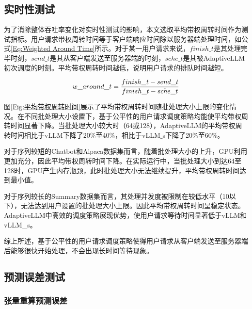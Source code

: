 \subsection{实时性测试}

为了消除整体吞吐率变化对实时性测试的影响，本文选取平均带权周转时间作为测试指标。用户请求带权周转时间等于客户端响应时间除以服务器端处理时间，如公式\ref{Eq:Weighted Around Time}所示。对于某一用户请求来说，$finish\_t$是其处理完毕时刻，$send\_t$是其从客户端发送至服务器端的时刻，$sche\_t$是其被AdaptiveLLM初次调度的时刻。平均带权周转时间越低，说明用户请求的排队时间越短。 

\begin{equation}
  \begin{aligned}
    w\_around\_t = \frac{finish\_t - send\_t}{finish\_t - sche\_t}
  \end{aligned}
  \label{Eq:Weighted Around Time}
  \setlength{\abovedisplayskip}{0ex}
  \setlength{\belowdisplayskip}{2ex}
\end{equation}


图\ref{Fig:平均带权周转时间}展示了平均带权周转时间随批处理大小上限的变化情况。在不同批处理大小设置下，基于公平性的用户请求调度策略均能使平均带权周转时间显著下降。当批处理大小较大时（64或128），AdaptiveLLM的平均带权周转时间相比于vLLM下降了20\%至40\%，相比于vLLM$\_$s下降了20\%至60\%。

对于序列较短的Chatbot和Alpaca数据集而言，随着批处理大小的上升，GPU利用更加充分，因此平均带权周转时间下降。在实际运行中，当批处理大小到达64至128时，GPU产生内存瓶颈，此时批处理大小无法继续提升，平均带权周转时间达到最小值。

对于序列较长的Summary数据集而言，其处理并发度被限制在较低水平（10以下），无法达到用户设置的批处理大小上限。因此平均带权周转时间呈稳定状态。AdaptiveLLM中高效的调度策略展现优势，使用户请求等待时间显著低于vLLM和vLLM\_s。

综上所述，基于公平性的用户请求调度策略使得用户请求从客户端发送至服务器端后能够很快开始处理，不会出现长时间等待现象。

\subsection{预测误差测试}

\subsubsection{张量重算预测误差}

